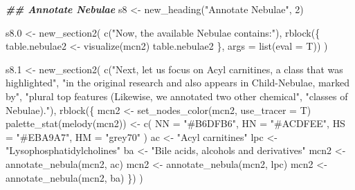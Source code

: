 \documentclass[
]{article}
\newenvironment{Shaded}{\begin{snugshade}}{\end{snugshade}}
\newcommand{\AttributeTok}[1]{\textcolor[rgb]{0.77,0.63,0.00}{#1}}
\newcommand{\DecValTok}[1]{\textcolor[rgb]{0.00,0.00,0.81}{#1}}
\newcommand{\DocumentationTok}[1]{\textcolor[rgb]{0.56,0.35,0.01}{\textbf{\textit{#1}}}}
\newcommand{\FloatTok}[1]{\textcolor[rgb]{0.00,0.00,0.81}{#1}}
\newcommand{\FunctionTok}[1]{\textcolor[rgb]{0.00,0.00,0.00}{#1}}
\newcommand{\NormalTok}[1]{#1}
\newcommand{\OtherTok}[1]{\textcolor[rgb]{0.56,0.35,0.01}{#1}}
\newcommand{\StringTok}[1]{\textcolor[rgb]{0.31,0.60,0.02}{#1}}
\begin{document}
\begin{Shaded}
\begin{Highlighting}[]
\DocumentationTok{\#\# Annotate Nebulae}
\NormalTok{s8 }\OtherTok{\textless{}{-}} \FunctionTok{new\_heading}\NormalTok{(}\StringTok{"Annotate Nebulae"}\NormalTok{, }\DecValTok{2}\NormalTok{)}

\NormalTok{s8}\FloatTok{.0} \OtherTok{\textless{}{-}} \FunctionTok{new\_section2}\NormalTok{(}
  \FunctionTok{c}\NormalTok{(}\StringTok{"Now, the available Nebulae contains:"}\NormalTok{),}
  \FunctionTok{rblock}\NormalTok{(\{}
\NormalTok{    table.nebulae2 }\OtherTok{\textless{}{-}} \FunctionTok{visualize}\NormalTok{(mcn2)}
\NormalTok{    table.nebulae2}
\NormalTok{  \}, }\AttributeTok{args =} \FunctionTok{list}\NormalTok{(}\AttributeTok{eval =}\NormalTok{ T))}
\NormalTok{)}

\NormalTok{s8}\FloatTok{.1} \OtherTok{\textless{}{-}} \FunctionTok{new\_section2}\NormalTok{(}
  \FunctionTok{c}\NormalTok{(}\StringTok{"Next, let us focus on Acyl carnitines, a class that was highlighted"}\NormalTok{,}
    \StringTok{"in the original research and also appears in Child{-}Nebulae, marked by"}\NormalTok{,}
    \StringTok{"plural top features (Likewise, we annotated two other chemical"}\NormalTok{,}
    \StringTok{"classes of Nebulae)."}\NormalTok{),}
  \FunctionTok{rblock}\NormalTok{(\{}
\NormalTok{    mcn2 }\OtherTok{\textless{}{-}} \FunctionTok{set\_nodes\_color}\NormalTok{(mcn2, }\AttributeTok{use\_tracer =}\NormalTok{ T)}
    \FunctionTok{palette\_stat}\NormalTok{(}\FunctionTok{melody}\NormalTok{(mcn2)) }\OtherTok{\textless{}{-}} \FunctionTok{c}\NormalTok{(}
      \AttributeTok{NN =} \StringTok{"\#B6DFB6"}\NormalTok{, }\AttributeTok{HN =} \StringTok{"\#ACDFEE"}\NormalTok{, }\AttributeTok{HS =} \StringTok{"\#EBA9A7"}\NormalTok{, }\AttributeTok{HM =} \StringTok{"grey70"}
\NormalTok{    )}
\NormalTok{    ac }\OtherTok{\textless{}{-}} \StringTok{"Acyl carnitines"}
\NormalTok{    lpc }\OtherTok{\textless{}{-}} \StringTok{"Lysophosphatidylcholines"}
\NormalTok{    ba }\OtherTok{\textless{}{-}} \StringTok{"Bile acids, alcohols and derivatives"}
\NormalTok{    mcn2 }\OtherTok{\textless{}{-}} \FunctionTok{annotate\_nebula}\NormalTok{(mcn2, ac)}
\NormalTok{    mcn2 }\OtherTok{\textless{}{-}} \FunctionTok{annotate\_nebula}\NormalTok{(mcn2, lpc)}
\NormalTok{    mcn2 }\OtherTok{\textless{}{-}} \FunctionTok{annotate\_nebula}\NormalTok{(mcn2, ba)}
\NormalTok{  \})}
\NormalTok{)}


\end{Highlighting}
\end{Shaded}
\end{document}
